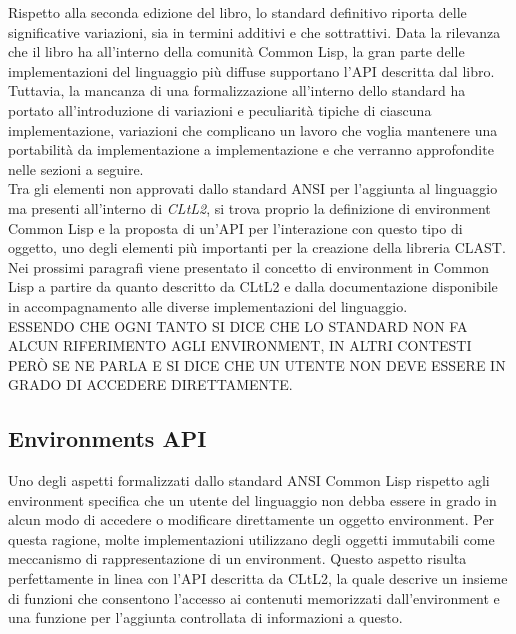 Rispetto alla seconda edizione del libro, lo standard definitivo riporta delle
significative variazioni, sia in termini additivi e che sottrattivi. Data la
rilevanza che il libro ha all’interno della comunità Common Lisp, la gran
parte delle implementazioni del linguaggio più diffuse supportano l’API
descritta dal libro. Tuttavia, la mancanza di una formalizzazione all’interno
dello standard ha portato all’introduzione di variazioni e peculiarità tipiche
di ciascuna implementazione, variazioni che complicano un lavoro che voglia
mantenere una portabilità da implementazione a implementazione e che verranno
approfondite nelle sezioni a seguire.\\

Tra gli elementi non approvati dallo standard ANSI per l’aggiunta al
linguaggio ma presenti all’interno di \textit{CLtL2}, si trova proprio la
definizione di environment Common Lisp e la proposta di un'API per
l’interazione con questo tipo di oggetto, uno degli elementi più importanti
per la creazione della libreria CLAST. Nei prossimi paragrafi viene presentato
il concetto di environment in Common Lisp a partire da quanto descritto da
CLtL2 e dalla documentazione disponibile in accompagnamento alle diverse
implementazioni del linguaggio.\\

ESSENDO CHE OGNI TANTO SI DICE CHE LO STANDARD NON FA ALCUN RIFERIMENTO AGLI
ENVIRONMENT, IN ALTRI CONTESTI PERÒ SE NE PARLA E SI DICE CHE UN UTENTE NON
DEVE ESSERE IN GRADO DI ACCEDERE DIRETTAMENTE.

\subsection{Environments API}

Uno degli aspetti formalizzati dallo standard ANSI Common Lisp rispetto agli
environment specifica che un utente del linguaggio non debba essere in grado
in alcun modo di accedere o modificare direttamente un oggetto environment.
Per questa ragione, molte implementazioni utilizzano degli oggetti immutabili
come meccanismo di rappresentazione di un environment. Questo aspetto risulta
perfettamente in linea con l’API descritta da CLtL2, la quale descrive un
insieme di funzioni che consentono l’accesso ai contenuti memorizzati
dall’environment e una funzione per l’aggiunta controllata di informazioni a
questo.

